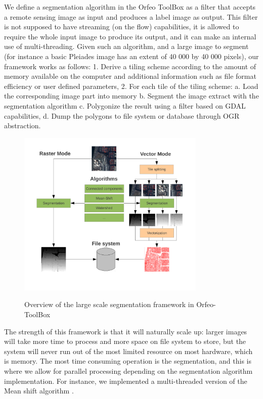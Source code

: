 \documentclass{josis}
\begin{document}
We define a segmentation algorithm in the Orfeo ToolBox as a filter
that accepts a remote sensing image as input and produces a label
image as output. This filter is not supposed to have streaming (on the
flow) capabilities, it is allowed to require the whole input image to
produce its output, and it can make an internal use of
multi-threading. Given such an algorithm, and a large image to segment
(for instance a basic Pleiades image \cite{} has an extent of 40
000 by 40 000 pixels), our framework works as follows:
1. Derive a tiling scheme according to the amount of memory available
on the computer and additional information such as file format
efficiency or user defined parameters,
2. For each tile of the tiling scheme:
   a. Load the corresponding image part into memory
   b. Segment the image extract with the segmentation algorithm
   c. Polygonize the result using a filter based on GDAL capabilities,
   d. Dump the polygons to file system or database through OGR
      abstraction.

\begin{figure}[!htb]
\centering
\includegraphics[width=0.8\textwidth]{Pictures/schema_ogrs}\label{fig:overview}
\caption{Overview of the large scale segmentation framework in Orfeo-ToolBox}
\end{figure}

The strength of this framework is that it will naturally scale up:
larger images will take more time to process and more space on file
system to store, but the system will never run out of the most limited
resource on most hardware, which is memory. The most time consuming
operation is the segmentation, and this is where we allow for parallel
processing depending on the segmentation algorithm implementation. For
instance, we implemented a multi-threaded version of the Mean shift
algorithm \cite{Comaniciu2002mean}.
 
\end{document}
